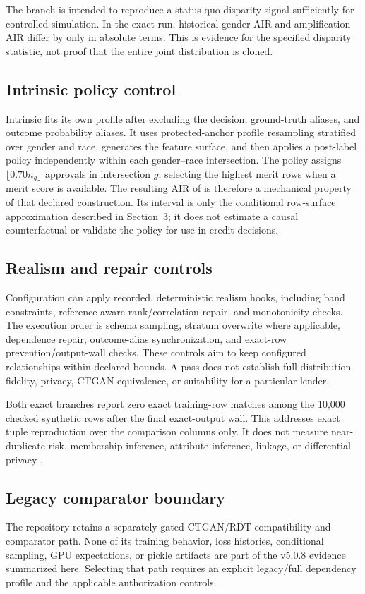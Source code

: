 The branch is intended to reproduce a status-quo disparity signal sufficiently for controlled
simulation. In the exact run, historical gender AIR \GenderAIRHistorical{} and amplification AIR
\GenderAIRAmplification{} differ by only \GenderAIRFidelityAbs{} in absolute terms. This is evidence
for the specified disparity statistic, not proof that the entire joint distribution is cloned.

\subsection{Intrinsic policy control}

Intrinsic fits its own profile after excluding the decision, ground-truth aliases, and outcome
probability aliases. It uses protected-anchor profile resampling stratified over gender and race,
generates the feature surface, and then applies a post-label policy independently within each
gender--race intersection. The policy assigns $\lfloor 0.70n_g\rfloor$ approvals in intersection
$g$, selecting the highest merit rows when a merit score is available. The resulting AIR of
\GenderAIRIntrinsic{} is therefore a mechanical property of that declared construction. Its
interval is only the conditional row-surface approximation described in Section~3; it does not
estimate a causal counterfactual or validate the policy for use in credit decisions.

\subsection{Realism and repair controls}

Configuration can apply recorded, deterministic realism hooks, including band constraints,
reference-aware rank/correlation repair, and monotonicity checks. The execution order is schema
sampling, stratum overwrite where applicable, dependence repair, outcome-alias synchronization,
and exact-row prevention/output-wall checks. These controls aim to keep configured relationships
within declared bounds. A pass does not establish full-distribution fidelity, privacy, CTGAN
equivalence, or suitability for a particular lender.

Both exact branches report zero exact training-row matches among the 10,000 checked synthetic rows
after the final exact-output wall. This addresses exact tuple reproduction over the comparison
columns only. It does not measure near-duplicate risk, membership inference, attribute inference,
linkage, or differential privacy \citep{stadler2022synthetic}.

\subsection{Legacy comparator boundary}

The repository retains a separately gated CTGAN/RDT compatibility and comparator path. None of its
training behavior, loss histories, conditional sampling, GPU expectations, or pickle artifacts are
part of the v5.0.8 evidence summarized here. Selecting that path requires an explicit legacy/full
dependency profile and the applicable authorization controls.

